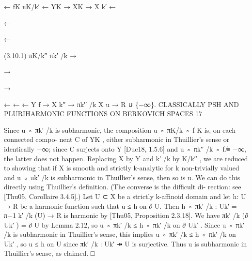 \documentclass[
  10pt,
]{article}
\newenvironment{Shaded}{}{}
\newcommand{\NormalTok}[1]{#1}
\begin{document}
\begin{Shaded}
\begin{Highlighting}[]
\NormalTok{                               ←   fK            πK/k′}
\NormalTok{                                                 ←}
\NormalTok{                          YK            → XK          → X k′}
\NormalTok{                          ←}



\NormalTok{                                           ←}



\NormalTok{                                                            ←}




\NormalTok{(3.10.1)                                     πK/k′′             πk′ /k}
\NormalTok{                          →}



\NormalTok{                                          →}



\NormalTok{                                                            →}




\NormalTok{                               ←                 ←                ←}
\NormalTok{                           Y       f}
\NormalTok{                                       → X k′′         →}
\NormalTok{                                                  πk′′ /k   X            u → R ∪ \{−∞\}.}
\NormalTok{             CLASSICALLY PSH AND PLURIHARMONIC FUNCTIONS ON BERKOVICH SPACES                 17}

\NormalTok{Since u ◦ πk′ /k is subharmonic, the composition u ◦ πK/k ◦ f K is, on each connected compo{-}}
\NormalTok{nent C of YK , either subharmonic in Thuillier’s sense or identically −∞; since C surjects}
\NormalTok{onto Y [Duc18, 1.5.6] and u ◦ πk′′ /k ◦ f ̸≡ −∞, the latter does not happen. Replacing}
\NormalTok{X by Y and k′ /k by K/k′′ , we are reduced to showing that if X is smooth and strictly}
\NormalTok{k{-}analytic for k non{-}trivially valued and u ◦ πk′ /k is subharmonic in Thuillier’s sense, then}
\NormalTok{so is u.}
\NormalTok{   We can do this directly using Thuillier’s definition. (The converse is the difficult di{-}}
\NormalTok{rection: see [Thu05, Corollaire 3.4.5].) Let U ⊂ X be a strictly k{-}affinoid domain and}
\NormalTok{let h: U → R be a harmonic function such that u ≤ h on ∂ U. Then h ◦ πk′ /k : Uk′ =}
\NormalTok{π−1}
\NormalTok{  k′ /k}
\NormalTok{        (U) → R is harmonic by [Thu05, Proposition 2.3.18]. We have πk′ /k (∂ Uk′ ) = ∂ U by}
\NormalTok{Lemma 2.12, so u ◦ πk′ /k ≤ h ◦ πk′ /k on ∂ Uk′ . Since u ◦ πk′ /k is subharmonic in Thuillier’s}
\NormalTok{sense, this implies u ◦ πk′ /k ≤ h ◦ πk′ /k on Uk′ , so u ≤ h on U since πk′ /k : Uk′ ↠ U is}
\NormalTok{surjective. Thus u is subharmonic in Thuillier’s sense, as claimed.                          □}


\end{Highlighting}
\end{Shaded}
\end{document}
